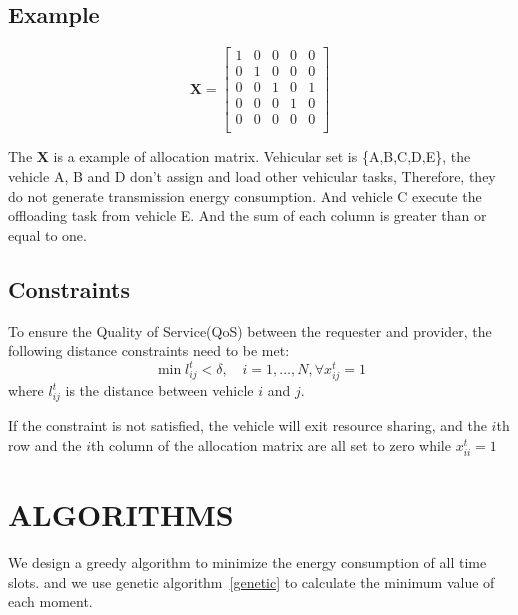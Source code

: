 \documentclass[conference]{IEEEtran}
\begin{document}
	\subsection{Example}
	\begin{equation*}
		\mathbf{X} = 
		\begin{bmatrix}		
			1  &  0  &  0   &0  &  0 \\
			0  &  1  &  0  &  0 &   0\\
			0  &  0  &  1 &   0  &  1\\
			0  &  0 &  0   & 1   & 0 \\
			0  &  0 &   0   & 0 &   0\\
		\end{bmatrix}
	\end{equation*}
	
	The $\mathbf{X}$ is a example of allocation matrix. Vehicular set is \{A,B,C,D,E\}, the vehicle A, B and D don't assign and load other vehicular tasks, Therefore, they do not generate transmission energy consumption. And vehicle C execute the offloading task from vehicle E. And the sum of each column is greater than or equal to one. 
	
	\subsection{Constraints}
	To ensure the Quality of Service(QoS) between the requester and provider, the following distance constraints need to be met:
	\begin{equation}
		\min\limits_{ }
		l_{ij}^{t}<\delta
		,\quad
		i = 1,\dots,N,\forall x_{ij}^{t} =1
	\end{equation}
	where $l_ {ij}^{t}$ is the distance between vehicle $i$ and  $j$. 
	
	If the constraint is not satisfied, the vehicle will exit resource sharing, and the $i$th row and the $i$th column of the allocation matrix are all set to zero while $x_{ii}^{t}=1$
	
	
	\section{ALGORITHMS}
	
	We design a greedy algorithm%
	to minimize the energy consumption of all time slots. 
	and we use genetic algorithm~\ref{genetic} to calculate the minimum value of each moment. 
	
\end{document}
